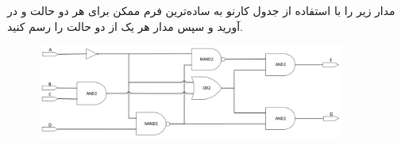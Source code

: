 مدار زیر را با استفاده از جدول کارنو به ساده‌ترین فرم ممکن برای هر دو حالت  و  در آورید و سپس مدار هر یک از دو حالت را رسم کنید.


\begin{figure}[h]
	\centering
	\includegraphics[width=0.9\textwidth]{fig/img1.png}
	\label{img1}
\end{figure}